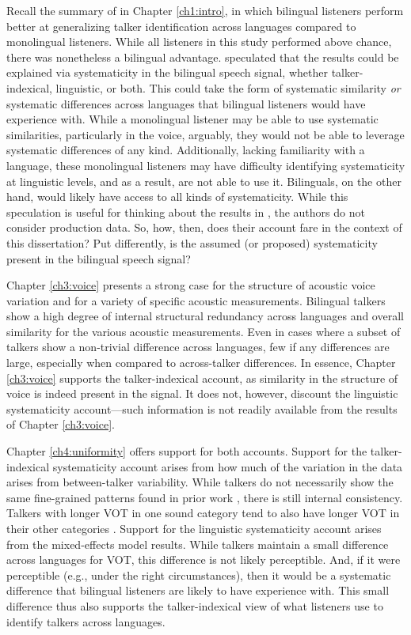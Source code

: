 Recall the summary of \citet{orena_2019_identifying} in Chapter \ref{ch1:intro}, in which bilingual listeners perform better at generalizing talker identification across languages compared to monolingual listeners. While all listeners in this study performed above chance, there was nonetheless a bilingual advantage. \citeauthor{orena_2019_identifying} speculated that the results could be explained via systematicity in the bilingual speech signal, whether talker-indexical, linguistic, or both. This could take the form of systematic similarity \textit{or} systematic differences across languages that bilingual listeners would have experience with. While a monolingual listener may be able to use systematic similarities, particularly in the voice, arguably, they would not be able to leverage systematic differences of any kind. Additionally, lacking familiarity with a language, these monolingual listeners may have difficulty identifying systematicity at linguistic levels, and as a result, are not able to use it. Bilinguals, on the other hand, would likely have access to all kinds of systematicity. While this speculation is useful for thinking about the results in \citet{orena_2019_identifying}, the authors do not consider production data. So, how, then, does their account fare in the context of this dissertation? Put differently, is the assumed (or proposed) systematicity present in the bilingual speech signal? 

Chapter \ref{ch3:voice} presents a strong case for the structure of acoustic voice variation and for a variety of specific acoustic measurements. Bilingual talkers show a high degree of internal structural redundancy across languages and overall similarity for the various acoustic measurements. Even in cases where a subset of talkers show a non-trivial difference across languages, few if any differences are large, especially when compared to across-talker differences. In essence, Chapter \ref{ch3:voice} supports the talker-indexical account, as similarity in the structure of voice is indeed present in the signal. It does not, however, discount the linguistic systematicity account---such information is not readily available from the results of Chapter \ref{ch3:voice}.

Chapter \ref{ch4:uniformity} offers support for both accounts. Support for the talker-indexical systematicity account arises from how much of the variation in the data arises from between-talker variability. While talkers do not necessarily show the same fine-grained patterns found in prior work \citep[e.g.,][]{chodroff_2017_structure}, there is still internal consistency. Talkers with longer VOT in one sound category tend to also have longer VOT in their other categories \citep[for a similar conclusion regarding speech rate, see][]{bradlow_2017_rate}. Support for the linguistic systematicity account arises from the mixed-effects model results. While talkers maintain a small difference across languages for VOT, this difference is not likely perceptible. And, if it were perceptible (e.g., under the right circumstances), then it would be a systematic difference that bilingual listeners are likely to have experience with. This small difference thus also supports the talker-indexical view of what listeners use to identify talkers across languages.

